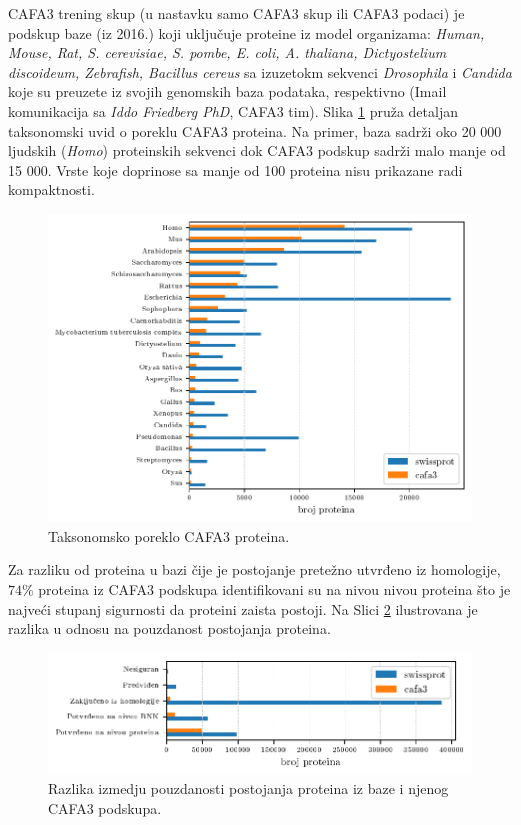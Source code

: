 CAFA3 trening skup (u nastavku samo CAFA3 skup ili CAFA3 podaci) je podskup \swissprot baze (iz 2016.) koji
uključuje proteine iz model organizama: \textit{Human, Mouse, Rat, S.
cerevisiae, S. pombe, E. coli, A. thaliana, Dictyostelium discoideum,
Zebrafish, Bacillus cereus} sa izuzetokm sekvenci \textit{Drosophila} i \textit{Candida}
koje su preuzete iz svojih genomskih baza podataka, respektivno (Imail
komunikacija sa \textit{Iddo Friedberg PhD}, CAFA3 tim).
Slika \ref{fig:sp_vs_cafa3} pruža detaljan taksonomski uvid o poreklu CAFA3 proteina.
Na primer, \swissprot baza sadrži oko 20 000 ljudskih (\textit{Homo})
proteinskih sekvenci dok CAFA3 podskup sadrži malo manje od 15 000.  Vrste
koje doprinose sa manje od 100 proteina nisu prikazane radi kompaktnosti.

\begin{figure}[th]
\centering
\hspace*{-3.0cm} 
\includegraphics[]{plots/sp_vs_cafa3}
\caption{Taksonomsko poreklo CAFA3 proteina. \\ \footnotesize 
}
\label{fig:sp_vs_cafa3}
\end{figure}

Za razliku od proteina u \swissprot bazi čije je postojanje pretežno utvrđeno
iz homologije, $74\%$ proteina iz CAFA3 podskupa identifikovani su na nivou
nivou proteina što je najveći stupanj sigurnosti da proteini zaista postoji. Na
Slici \ref{fig:cafa3_pe} ilustrovana je razlika u odnosu na pouzdanost
postojanja proteina. 



\begin{figure}[th]
\centering
\hspace*{-2.5cm} 
\includegraphics[]{plots/cafa3_pe}
\caption{Razlika izmedju pouzdanosti postojanja proteina iz \swissprot baze i njenog CAFA3 podskupa. }
\label{fig:cafa3_pe}
\end{figure}


